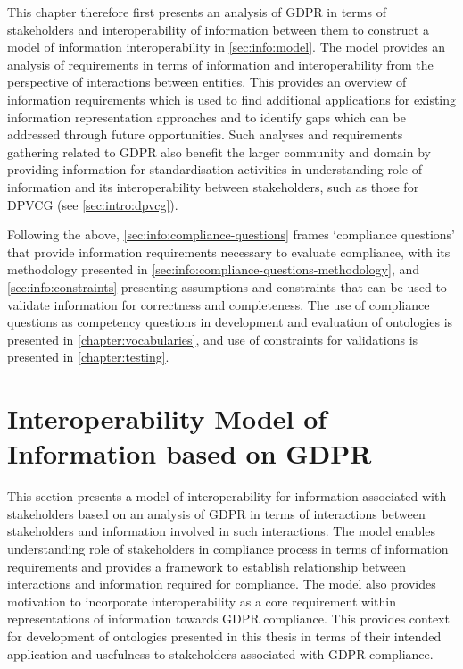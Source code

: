 This chapter therefore first presents an analysis of GDPR in terms of stakeholders and interoperability of information between them to construct a model of information interoperability in \autoref{sec:info:model}.
The model provides an analysis of requirements in terms of information and interoperability from the perspective of interactions between entities.
This provides an overview of information requirements which is used to find additional applications for existing information representation approaches and to identify gaps which can be addressed through future opportunities.
Such analyses and requirements gathering related to GDPR also benefit the larger community and domain by providing information for standardisation activities in understanding role of information and its interoperability between stakeholders, such as those for DPVCG (see \autoref{sec:intro:dpvcg}).

Following the above, \autoref{sec:info:compliance-questions} frames `compliance questions' that provide information requirements necessary to evaluate compliance, with its methodology presented in \autoref{sec:info:compliance-questions-methodology}, and \autoref{sec:info:constraints} presenting assumptions and constraints that can be used to validate information for correctness and completeness.
The use of compliance questions as competency questions in development and evaluation of ontologies is presented in \autoref{chapter:vocabularies}, and  use of constraints for validations is presented in \autoref{chapter:testing}.

\section{Interoperability Model of Information based on GDPR}\label{sec:info:model}
This section presents a model of interoperability for information associated with stakeholders based on an analysis of GDPR in terms of interactions between stakeholders and information involved in such interactions. The model enables understanding role of stakeholders in compliance process in terms of information requirements and provides a framework to establish relationship between interactions and information required for compliance. 
The model also provides motivation to incorporate interoperability as a core requirement within representations of information towards GDPR compliance.
This provides context for development of ontologies presented in this thesis in terms of their intended application and usefulness to stakeholders associated with GDPR compliance.

